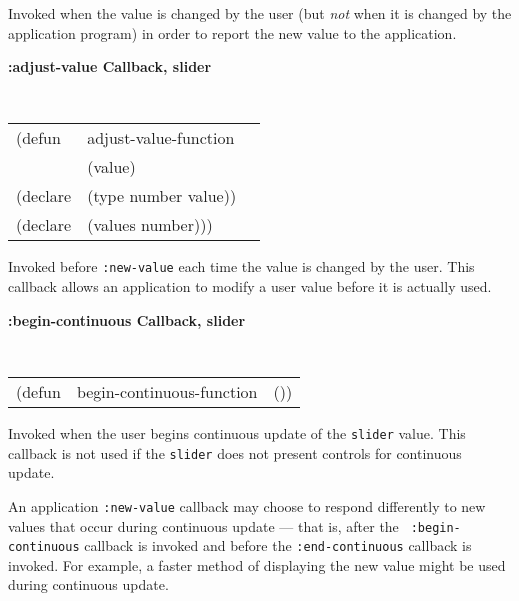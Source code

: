 \begin{flushright} \parbox[t]{6.125in}{
Invoked when the value is changed by the user (but {\em not} when it is changed
by the application program) in order to report the new value to the application.


}\end{flushright}



{\samepage
{\large {\bf :adjust-value \hfill Callback, slider}} 
\begin{flushright} 
\parbox[t]{6.125in}{
\tt
\begin{tabular}{lll}
\raggedright
(defun & adjust-value-function & \\ 
& (value) \\
(declare &(type  number  value))\\
(declare & (values number)))
\end{tabular}
\rm

}\end{flushright}}

\begin{flushright} \parbox[t]{6.125in}{
Invoked before {\tt :new-value} each time the value is changed by the user. This
callback allows an application to modify a user value before it is actually
used. 


}\end{flushright}

{\samepage
{\large {\bf :begin-continuous \hfill Callback, slider}} 
\begin{flushright} 
\parbox[t]{6.125in}{
\tt
\begin{tabular}{lll}
\raggedright
(defun & begin-continuous-function & ())
\end{tabular}
\rm

}\end{flushright}}

\begin{flushright} \parbox[t]{6.125in}{
Invoked when the user begins continuous update of the {\tt slider} value. This
callback is not used if the {\tt slider} does not present controls for
continuous update. 

An application {\tt :new-value} callback may choose to respond differently to new
values that occur during continuous update --- that is, after the {\tt
:begin-continuous} callback is invoked and before the {\tt :end-continuous}
callback is invoked. For example, a faster method of displaying the new value
might be used during continuous update.

}\end{flushright}


